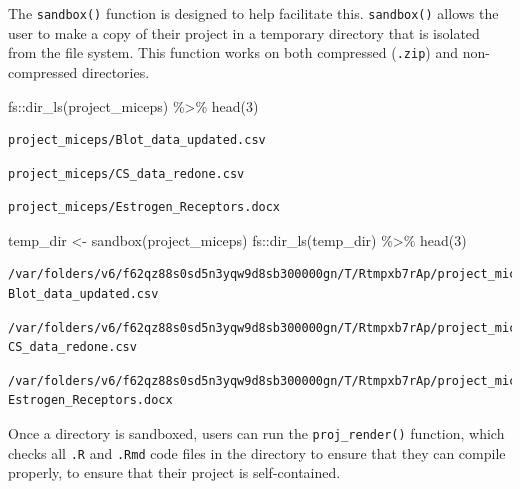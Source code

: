 \documentclass[12pt,twoside]{reedthesis}
\newenvironment{Shaded}{\begin{snugshade}}{\end{snugshade}}
\newcommand{\DecValTok}[1]{\textcolor[rgb]{0.00,0.00,0.81}{#1}}
\newcommand{\FunctionTok}[1]{\textcolor[rgb]{0.00,0.00,0.00}{#1}}
\newcommand{\NormalTok}[1]{#1}
\newcommand{\OtherTok}[1]{\textcolor[rgb]{0.56,0.35,0.01}{#1}}
\newcommand{\SpecialCharTok}[1]{\textcolor[rgb]{0.00,0.00,0.00}{#1}}
\newcommand{\StringTok}[1]{\textcolor[rgb]{0.31,0.60,0.02}{#1}}
\begin{document}
The \texttt{sandbox()} function is designed to help facilitate this. \texttt{sandbox()} allows the user to make a copy of their project in a temporary directory that is isolated from the file system. This function works on both compressed (\texttt{.zip}) and non-compressed directories.
\begin{Shaded}
\begin{Highlighting}[]
\NormalTok{fs}\SpecialCharTok{::}\FunctionTok{dir\_ls}\NormalTok{(}\StringTok{\textquotesingle{}project\_miceps\textquotesingle{}}\NormalTok{) }\SpecialCharTok{\%\textgreater{}\%} \FunctionTok{head}\NormalTok{(}\DecValTok{3}\NormalTok{)}
\end{Highlighting}
\end{Shaded}
\begin{verbatim}
project_miceps/Blot_data_updated.csv 
\end{verbatim}
\begin{verbatim}
project_miceps/CS_data_redone.csv 
\end{verbatim}
\begin{verbatim}
project_miceps/Estrogen_Receptors.docx
\end{verbatim}
\begin{Shaded}
\begin{Highlighting}[]
\NormalTok{temp\_dir }\OtherTok{\textless{}{-}} \FunctionTok{sandbox}\NormalTok{(}\StringTok{\textquotesingle{}project\_miceps\textquotesingle{}}\NormalTok{)}
\NormalTok{fs}\SpecialCharTok{::}\FunctionTok{dir\_ls}\NormalTok{(temp\_dir) }\SpecialCharTok{\%\textgreater{}\%} \FunctionTok{head}\NormalTok{(}\DecValTok{3}\NormalTok{)}
\end{Highlighting}
\end{Shaded}
\begin{verbatim}
/var/folders/v6/f62qz88s0sd5n3yqw9d8sb300000gn/T/Rtmpxb7rAp/project_miceps/
Blot_data_updated.csv 
\end{verbatim}
\begin{verbatim}
/var/folders/v6/f62qz88s0sd5n3yqw9d8sb300000gn/T/Rtmpxb7rAp/project_miceps/
CS_data_redone.csv 
\end{verbatim}
\begin{verbatim}
/var/folders/v6/f62qz88s0sd5n3yqw9d8sb300000gn/T/Rtmpxb7rAp/project_miceps/
Estrogen_Receptors.docx
\end{verbatim}
Once a directory is sandboxed, users can run the \texttt{proj\_render()} function, which checks all \texttt{.R} and \texttt{.Rmd} code files in the directory to ensure that they can compile properly, to ensure that their project is self-contained.
\end{document}
